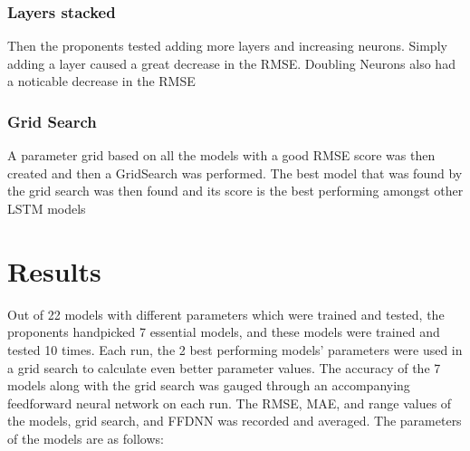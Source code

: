 \documentclass[10pt,11pt,12pt,oneside]{book}
\begin{document}
\subsubsection{Layers stacked}
Then the proponents tested adding more layers and increasing neurons. Simply adding a layer caused a great decrease in the RMSE. Doubling Neurons also had a noticable decrease in the RMSE
\subsubsection{Grid Search}
A parameter grid based on all the models with a good RMSE score was then created and then a GridSearch was performed. The best model that was found by the grid search was then found and its score is the best performing amongst other LSTM models
\section{Results}
Out of 22 models with different parameters which were trained and tested, the proponents handpicked 7 essential models, and these models were trained and tested 10 times. Each run, the 2 best performing models’ parameters were used in a grid search to calculate even better parameter values. The accuracy of the 7 models along with the grid search was gauged through an accompanying feedforward neural network on each run. The RMSE, MAE, and range values of the models, grid search, and FFDNN was recorded and averaged. The parameters of the models are as follows:
\end{document}
